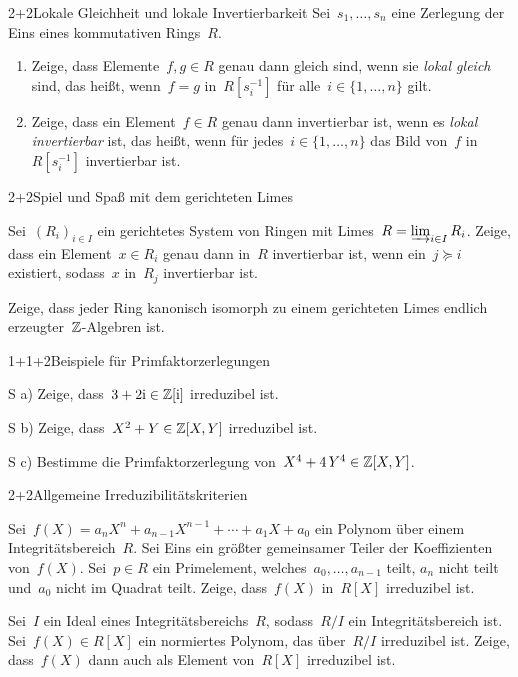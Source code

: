 \documentclass{algblatt}
\begin{document}

\begin{aufgabe}{2+2}{Lokale Gleichheit und lokale Invertierbarkeit}
Sei~$s_1,\ldots,s_n$ eine Zerlegung der Eins eines kommutativen Rings~$R$.
\begin{enumerate}
\item Zeige, dass Elemente~$f, g \in R$ genau dann gleich sind, wenn sie
\emph{lokal gleich} sind, das heißt, wenn~$f = g$ in~$R[s_i^{-1}]$ für alle~$i
\in \{ 1,\ldots, n \}$ gilt.
\item Zeige, dass ein Element~$f \in R$ genau dann invertierbar ist, wenn es
\emph{lokal invertierbar} ist, das heißt, wenn für jedes~$i \in
\{1,\ldots,n\}$ das Bild von~$f$ in~$R[s_i^{-1}]$ invertierbar ist.
\end{enumerate}
\end{aufgabe}

\begin{aufgabeE}{2+2}{Spiel und Spaß mit dem gerichteten Limes}
\item Sei~$(R_i)_{i \in I}$ ein gerichtetes System von Ringen mit Limes~$R =
\varinjlim_{i \in I} R_i$. Zeige, dass ein Element~$x \in R_i$ genau dann
in~$R$ invertierbar ist, wenn ein~$j \succeq i$ existiert, sodass~$x$ in~$R_j$
invertierbar ist.

\item Zeige, dass jeder Ring kanonisch isomorph zu einem gerichteten Limes endlich erzeugter~$\mathbb{Z}$-Algebren
ist.
\end{aufgabeE}
\enlargethispage{1em}

\begin{aufgabeE}{1+1+2}{Beispiele für Primfaktorzerlegungen}
\item[S a)] Zeige, dass~$3 + 2\mathrm{i} \in \mathbb{Z}[\mathrm{i}]$ irreduzibel ist.
\item[S b)] Zeige, dass~$X^2 + Y \in \mathbb{Z}[X,Y]$ irreduzibel ist.
\item[S c)] Bestimme die Primfaktorzerlegung von~$X^4 + 4\,Y^4 \in \mathbb{Z}[X,Y]$.
\end{aufgabeE}

\begin{aufgabeE}{2+2}{Allgemeine Irreduzibilitätskriterien}
\item Sei~$f(X) = a_n X^n + a_{n-1} X^{n-1} + \cdots + a_1 X + a_0$ ein Polynom
über einem Integritätsbereich~$R$. Sei Eins ein größter gemeinsamer Teiler der
Koeffizienten von~$f(X)$. Sei~$p \in R$ ein Primelement,
welches~$a_0,\ldots,a_{n-1}$ teilt, $a_n$ nicht teilt und~$a_0$ nicht im
Quadrat teilt. Zeige, dass~$f(X)$ in~$R[X]$ irreduzibel ist.
\item Sei~$I$ ein Ideal eines Integritätsbereichs~$R$, sodass~$R/I$ ein
Integritätsbereich ist.
Sei~$f(X) \in R[X]$ ein normiertes Polynom, das über~$R/I$ irreduzibel ist.
Zeige, dass~$f(X)$ dann auch als Element von~$R[X]$ irreduzibel ist.
\end{aufgabeE}
\end{document}
